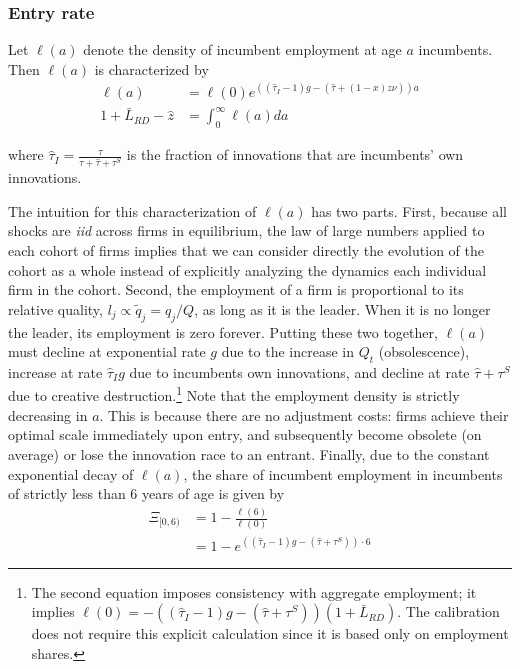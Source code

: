 \documentclass[11pt,english]{article}
\begin{document}
\subsubsection{Entry rate}\label{appendix:calibration:entryRate}

Let $\ell(a)$ denote the density of incumbent employment at age $a$ incumbents. Then $\ell(a)$ is characterized by 
\begin{align*}
\ell(a) &= \ell(0)e^{((\hat{\tau}_I -1)g - (\hat{\tau} + (1-x)z \nu))a}  \\
1 + \bar{L}_{RD} - \hat{z} &= \int_0^{\infty} \ell(a) da
\end{align*}

where $\hat{\tau}_I = \frac{\tau}{\tau + \hat{\tau} + \tau^S}$ is the fraction of innovations that are incumbents' own innovations. 

The intuition for this characterization of $\ell(a)$ has two parts. First, because all shocks are \textit{iid} across firms in equilibrium, the law of large numbers applied to each cohort of firms implies that we can consider directly the evolution of the cohort as a whole instead of explicitly analyzing the dynamics each individual firm in the cohort.  Second, the employment of a firm is proportional to its relative quality, $l_j \propto \tilde{q}_j = q_j / Q$, as long as it is the leader. When it is no longer the leader, its employment is zero forever. Putting these two together, $\ell(a)$ must decline at exponential rate $g$ due to the increase in $Q_t$ (obsolescence), increase at rate $\hat{\tau}_I g$ due to incumbents own innovations, and decline at rate $\hat{\tau} + \tau^S$ due to creative destruction.\footnote{The second equation imposes consistency with aggregate employment; it implies $\ell(0) = -((\hat{\tau}_I -1)g - (\hat{\tau} + \tau^S))(1 + \bar{L}_{RD})$. The calibration does not require this explicit calculation since it is based only on employment shares.} Note that the employment density is strictly decreasing in $a$. This is because there are no adjustment costs: firms achieve their optimal scale immediately upon entry, and subsequently become obsolete (on average) or lose the innovation race to an entrant. Finally, due to the constant exponential decay of $\ell(a)$, the share of incumbent employment in incumbents of strictly less than 6 years of age is given by 
\begin{align*}
\Xi_{[0,6)} &=  1 - \frac{\ell(6)}{\ell(0)} \\
&= 1 - e^{((\hat{\tau}_I -1)g - (\hat{\tau} + \tau^S))\cdot 6}
\end{align*}  
\end{document}
